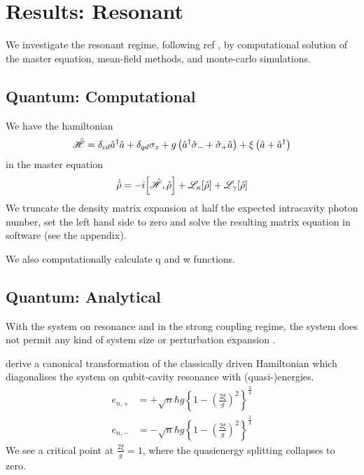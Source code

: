 \section{Results: Resonant}
We investigate the resonant regime, following ref \cite{Carmichael2015}, by computational solution of the master equation, mean-field methods, and monte-carlo simulations.
\subsection{Quantum: Computational}
We have the hamiltonian 
\begin{equation}
  \hat{\mathscr{H}} = \delta_{cd} {\hat{a}^\dagger} \hat{a} + \delta_{qd} \sigma_z + g \left({\hat{a}^\dagger} \hat{\sigma}_- + \hat{\sigma}_+ \hat{a} \right) + \xi \left(\hat{a} + {\hat{a}^\dagger} \right)
\end{equation}
in the master equation
\begin{equation}
  \dot{\dens} = -i \comm{\ham}{\dens} + \lindblad{\kappa}{\dens} + \lindblad{\gamma}{\dens}
\end{equation}
We truncate the density matrix expansion at half the expected intracavity photon number, set the left hand side to zero and solve the resulting matrix equation in software (see the appendix).

We also computationally calculate q and w functions.
\subsection{Quantum: Analytical}
With the system on resonance and in the strong coupling regime, the system does not permit any kind of system size or perturbation expansion \cite{Carmichael2015}.

\cite{Alsing1992} derive a canonical transformation of the classically driven Hamiltonian which diagonalises the system on qubit-cavity resonance with (quasi-)energies.
\begin{align}
  e_{n, +} &= + \sqrt{n} \hbar g {\left \{1 - {\left ({\frac{2\xi}{g}} \right )}^2 \right \}}^{\frac{3}{4}} \\
  e_{n, -} &= - \sqrt{n} \hbar g {\left \{1 - {\left ({\frac{2\xi}{g}} \right )}^2 \right \}}^{\frac{3}{4}}
\end{align}
We see a critical point at  $\frac{2\xi}{g} = 1$, where the quasienergy splitting collapses to zero.
